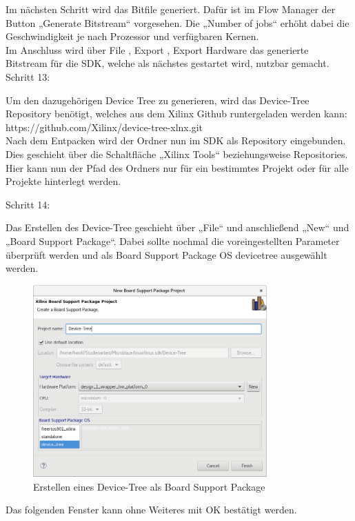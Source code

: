 Im nächsten Schritt wird das Bitfile generiert. Dafür ist im Flow Manager der Button „Generate Bitstream“ vorgesehen.
 Die „Number of jobs“ erhöht dabei die Geschwindigkeit je nach Prozessor und verfügbaren Kernen.\\
 Im Anschluss wird über File , Export , Export Hardware das generierte Bitstream für die SDK, welche als nächstes gestartet wird, nutzbar gemacht.\\


Schritt 13:

Um den dazugehörigen Device Tree zu generieren, wird das Device-Tree
 Repository benötigt, welches aus dem Xilinx Github runtergeladen werden kann: https://github.com/Xilinx/device-tree-xlnx.git\\
Nach dem Entpacken wird der Ordner nun im SDK als Repository eingebunden. Dies geschieht über die Schaltfläche „Xilinx Tools“ beziehungsweise Repositories. Hier kann nun der Pfad des Ordners nur für ein bestimmtes Projekt oder für alle Projekte hinterlegt werden.

Schritt 14:

Das Erstellen des Device-Tree geschieht über „File“ und anschließend „New“ und „Board Support Package“.
Dabei sollte nochmal die voreingestellten Parameter überprüft werden und als Board Support Package OS devicetree ausgewählt werden.

\begin{figure}[H]
\centering
\includegraphics[width=0.8\textwidth]{Hauptteil/Schritt14.png}
\caption{Erstellen eines Device-Tree als Board Support Package}
\label{fig:mbschritt14}
\end{figure}

Das folgenden Fenster kann ohne Weiteres mit OK bestätigt werden.\\


